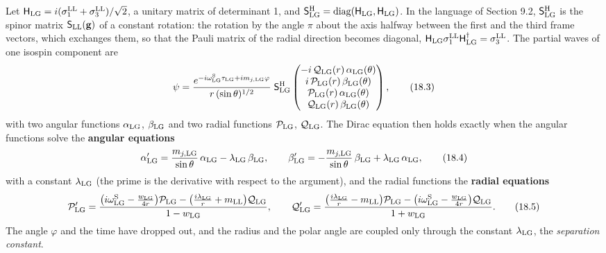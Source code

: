 \documentclass[
  10pt,
]{article}
\begin{document}
Let
\(\mathsf H_{\rm LG}=i(\sigma^{\rm LL}_1+\sigma^{\rm LL}_3)/\sqrt2\), a
unitary matrix of determinant 1, and
\(\mathsf S^{\rm H}_{\rm LG}=\mathrm{diag}(\mathsf H_{\rm LG},\mathsf H_{\rm LG})\).
In the language of Section 9.2, \(\mathsf S^{\rm H}_{\rm LG}\) is the
spinor matrix \(\mathsf S_{\rm LL}(\mathbf g)\) of a constant rotation:
the rotation by the angle \(\pi\) about the axis halfway between the
first and the third frame vectors, which exchanges them, so that the
Pauli matrix of the radial direction becomes diagonal,
\(\mathsf H_{\rm LG}\sigma^{\rm LL}_1\mathsf H_{\rm LG}^\dagger=\sigma^{\rm LL}_3\).
The partial waves of one isospin component are
\[\psi=\frac{e^{-i\omega^{\rm S}_{\rm LG}\tau_{\rm LG}+im_{j,{\rm LG}}\varphi}}{r\,(\sin\theta)^{1/2}}\;\mathsf S^{\rm H}_{\rm LG}\begin{pmatrix}-i\,\mathcal Q_{\rm LG}(r)\,\alpha_{\rm LG}(\theta)\\i\,\mathcal P_{\rm LG}(r)\,\beta_{\rm LG}(\theta)\\\mathcal P_{\rm LG}(r)\,\alpha_{\rm LG}(\theta)\\\mathcal Q_{\rm LG}(r)\,\beta_{\rm LG}(\theta)\end{pmatrix},\tag{18.3}\]
with two angular functions \(\alpha_{\rm LG}\), \(\beta_{\rm LG}\) and
two radial functions \(\mathcal P_{\rm LG}\), \(\mathcal Q_{\rm LG}\).
The Dirac equation then holds exactly when the angular functions solve
the \textbf{angular equations}
\[\alpha_{\rm LG}'=\frac{m_{j,{\rm LG}}}{\sin\theta}\,\alpha_{\rm LG}-\lambda_{\rm LG}\,\beta_{\rm LG},\qquad\beta_{\rm LG}'=-\frac{m_{j,{\rm LG}}}{\sin\theta}\,\beta_{\rm LG}+\lambda_{\rm LG}\,\alpha_{\rm LG},\tag{18.4}\]
with a constant \(\lambda_{\rm LG}\) (the prime is the derivative with
respect to the argument), and the radial functions the \textbf{radial
equations}
\[\mathcal P_{\rm LG}'=\frac{\big(i\omega^{\rm S}_{\rm LG}-\frac{w_{\rm LG}}{4r}\big)\mathcal P_{\rm LG}-\big(\frac{i\lambda_{\rm LG}}r+m_{\rm LL}\big)\mathcal Q_{\rm LG}}{1-w_{\rm LG}},\qquad\mathcal Q_{\rm LG}'=\frac{\big(\frac{i\lambda_{\rm LG}}r-m_{\rm LL}\big)\mathcal P_{\rm LG}-\big(i\omega^{\rm S}_{\rm LG}-\frac{w_{\rm LG}}{4r}\big)\mathcal Q_{\rm LG}}{1+w_{\rm LG}}.\tag{18.5}\]
The angle \(\varphi\) and the time have dropped out, and the radius and
the polar angle are coupled only through the constant
\(\lambda_{\rm LG}\), the \emph{separation constant}.
\end{document}
